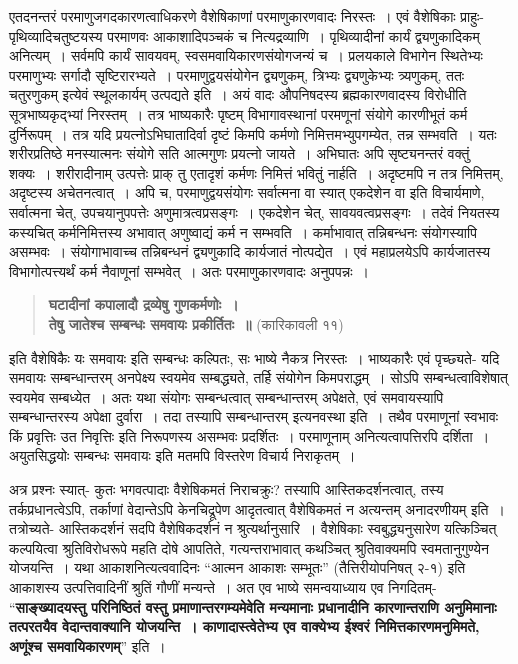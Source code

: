 {एतदनन्तरं परमाणुजगदकारणत्वाधिकरणे वैशेषिकाणां परमाणुकारणवादः निरस्तः~। एवं वैशेषिकाः प्राहुः- पृथिव्यादिचतुष्टयस्य परमाणवः आकाशादिपञ्चकं च नित्यद्रव्याणि~। पृथिव्यादीनां कार्यं द्व्यणुकादिकम् अनित्यम्~। सर्वमपि कार्यं सावयवम्, स्वसमवायिकारणसंयोगजन्यं च~। प्रलयकाले विभागेन स्थितेभ्यः परमाणुभ्यः सर्गादौ सृष्टिरारभ्यते~। परमाणुद्वयसंयोगेन द्व्यणुकम्, त्रिभ्यः द्व्यणुकेभ्यः त्र्यणुकम्, ततः चतुरणुकम् इत्येवं स्थूलकार्यम् उत्पद्यते इति~। अयं वादः औपनिषदस्य ब्रह्मकारणवादस्य विरोधीति सूत्रभाष्यकृद्भ्यां निरस्तम्~। तत्र भाष्यकारैः पृष्टम् विभागावस्थानां परमणूनां संयोगे कारणीभूतं कर्म दुर्निरूपम्~। तत्र यदि प्रयत्नोऽभिघातादिर्वा दृष्टं किमपि कर्मणो निमित्तमभ्युपगम्येत, तन्न सम्भवति~। यतः शरीरप्रतिष्ठे मनस्यात्मनः संयोगे सति आत्मगुणः प्रयत्नो जायते~। अभिघातः अपि सृष्ट्यनन्तरं वक्तुं शक्यः~। शरीरादीनाम् उत्पत्तेः प्राक् तु एतादृशं कर्मणः निमित्तं भवितुं नार्हति~। अदृष्टमपि न तत्र निमित्तम्, अदृष्टस्य अचेतनत्वात्~। अपि च, परमाणुद्वयसंयोगः सर्वात्मना वा स्यात् एकदेशेन वा इति विचार्यमाणे, सर्वात्मना चेत्, उपचयानुपपत्तेः अणुमात्रत्वप्रसङ्गः~। एकदेशेन चेत्, सावयवत्वप्रसङ्गः~। तदेवं नियतस्य कस्यचित् कर्मनिमित्तस्य अभावात् अणुष्वाद्यं कर्म न सम्भवति~। कर्माभावात् तन्निबन्धनः संयोगस्यापि असम्भवः~। संयोगाभावाच्च तन्निबन्धनं द्व्यणुकादि कार्यजातं नोत्पद्येत~। एवं महाप्रलयेऽपि कार्यजातस्य विभागोत्पत्त्यर्थं कर्म नैवाणूनां सम्भवेत्~। अतः परमाणुकारणवादः अनुपपन्नः~। 
\begin{verse}
\textbf{घटादीनां कपालादौ द्रव्येषु गुणकर्मणोः~। \\
तेषु जातेश्च सम्बन्धः समवायः प्रकीर्तितः~॥} (कारिकावली ११)
\end{verse}
इति वैशेषिकैः यः समवायः इति सम्बन्धः कल्पितः, सः भाष्ये नैकत्र निरस्तः~। भाष्यकारैः एवं पृच्छ्यते- यदि समवायः सम्बन्धान्तरम् अनपेक्ष्य स्वयमेव सम्बद्ध्यते, तर्हि संयोगेन किमपराद्धम्~। सोऽपि सम्बन्धत्वाविशेषात् स्वयमेव सम्बध्येत~। अतः यथा संयोगः सम्बन्धत्वात् सम्बन्धान्तरम् अपेक्षते, एवं समवायस्यापि सम्बन्धान्तरस्य अपेक्षा दुर्वारा~। तदा तस्यापि सम्बन्धान्तरम् इत्यनवस्था इति~। तथैव परमाणूनां स्वभावः किं प्रवृत्तिः उत निवृत्तिः इति निरूपणस्य असम्भवः प्रदर्शितः~। परमाणूनाम् अनित्यत्वापत्तिरपि दर्शिता~। अयुतसिद्धयोः सम्बन्धः समवायः इति मतमपि विस्तरेण विचार्य निराकृतम्~। 

अत्र प्रश्नः स्यात्- कुतः भगवत्पादाः वैशेषिकमतं निराचक्रुः? तस्यापि आस्तिकदर्शनत्वात्, तस्य तर्कप्रधानत्वेऽपि, तर्काणां वेदान्तेऽपि केनचिद्रूपेण आदृतत्वात् वैशेषिकमतं न अत्यन्तम् अनादरणीयम् इति~। तत्रोच्यते- आस्तिकदर्शनं सदपि वैशेषिकदर्शनं न श्रुत्यर्थानुसारि~। वैशेषिकाः स्वबुद्ध्यनुसारेण यत्किञ्चित् कल्पयित्वा श्रुतिविरोधरूपे महति दोषे आपतिते, गत्यन्तराभावात् कथञ्चित् श्रुतिवाक्यमपि स्वमतानुगुण्येन योजयन्ति~। यथा आकाशनित्यत्ववादिनः “आत्मन आकाशः सम्भूतः” (तैत्तिरीयोपनिषत् २-१) इति आकाशस्य उत्पत्तिवादिनीं श्रुतिं गौणीं मन्यन्ते~। अत एव भाष्ये समन्वयाध्याय एव निगदितम्- “\textbf{साङ्ख्यादयस्तु परिनिष्ठितं वस्तु प्रमाणान्तरगम्यमेवेति मन्यमानाः प्रधानादीनि कारणान्तराणि अनुमिमानाः तत्परतयैव वेदान्तवाक्यानि योजयन्ति~। काणादास्त्वेतेभ्य एव वाक्येभ्य ईश्वरं निमित्तकारणमनुमिमते, अणूंश्च समवायिकारणम्}” इति~। 

}
